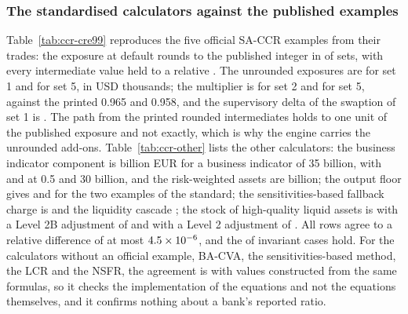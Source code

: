 \subsubsection{The standardised calculators against the published examples}

Table~\ref{tab:ccr-cre99} reproduces the five official SA-CCR examples from their trades: the exposure at default rounds to the published integer in \ccrCreExact{} of \ccrCreSets{} sets, with every intermediate value held to a relative \ccrCreTol. The unrounded exposures are \ccrCreEadOne{} for set 1 and \ccrCreEadFive{} for set 5, in USD thousands; the multiplier is \ccrCreMultTwo{} for set 2 and \ccrCreMultFive{} for set 5, against the printed
0.965 and 0.958, and the supervisory delta of the swaption of set 1 is \ccrCreDelta. The path from the printed rounded intermediates holds to one unit of the published exposure and not exactly, which is why the engine carries the unrounded add-ons. Table~\ref{tab:ccr-other} lists the other calculators: the business indicator component is \ccrSmaBic{} billion EUR for a business indicator of 35 billion, with \ccrSmaBicHalf{} and
\ccrSmaBicThirty{} at 0.5 and 30 billion, and the risk-weighted assets are \ccrSmaRwa{} billion; the output floor gives \ccrFloorValue{} and \ccrFloorCapped{} for the two examples of the standard; the sensitivities-based fallback charge is \ccrFallbackCharge{} and the liquidity cascade \ccrCascadeEs{}; the stock of high-quality liquid assets is \ccrHqlaOne{} with a Level 2B adjustment of \ccrHqlaAdjFifteen{} and \ccrHqlaTwo{} with a Level 2
adjustment of \ccrHqlaAdjForty. All \ccrOtherRows{} rows agree to a relative difference of at most $4.5\times10^{-6}$, and the \ccrInvariantHold{} of \ccrInvariantRows{} invariant cases hold. For the calculators without an official example, BA-CVA, the sensitivities-based method, the LCR and the NSFR, the agreement is with values constructed from the same formulas, so it checks the implementation of the equations and not the
equations themselves, and it confirms nothing about a bank's reported ratio.



